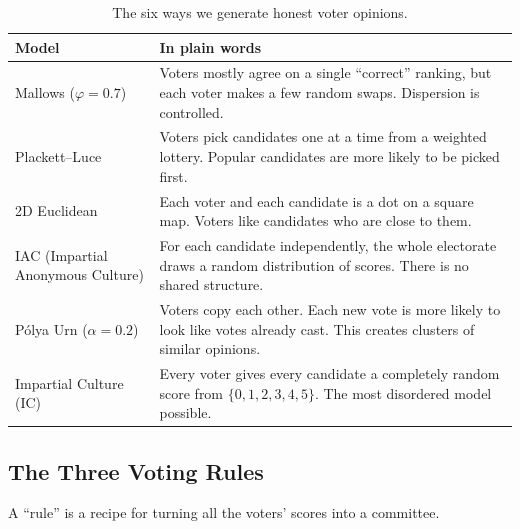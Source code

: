 \documentclass[11pt,a4paper]{article}
\begin{document}
\begin{table}[H]
  \centering
  \caption{The six ways we generate honest voter opinions.}
  \label{tab:cultures}
  \begin{tabular}{@{}p{4.2cm}p{10.5cm}@{}}
    \toprule
    Model & In plain words \\
    \midrule
    Mallows (\(\varphi = 0.7\)) &
    Voters mostly agree on a single ``correct'' ranking, but each voter makes
    a few random swaps. Dispersion is controlled. \\
    Plackett--Luce &
    Voters pick candidates one at a time from a weighted lottery. Popular
    candidates are more likely to be picked first. \\
    2D Euclidean &
    Each voter and each candidate is a dot on a square map. Voters like
    candidates who are close to them. \\
    IAC (Impartial Anonymous Culture) &
    For each candidate independently, the whole electorate draws a random
    distribution of scores. There is no shared structure. \\
    P\'olya Urn (\(\alpha = 0.2\)) &
    Voters copy each other. Each new vote is more likely to look like votes
    already cast. This creates clusters of similar opinions. \\
    Impartial Culture (IC) &
    Every voter gives every candidate a completely random score from
    \(\{0,1,2,3,4,5\}\). The most disordered model possible. \\
    \bottomrule
  \end{tabular}
\end{table}

\subsection{The Three Voting Rules}

A ``rule'' is a recipe for turning all the voters' scores into a committee.
\end{document}
